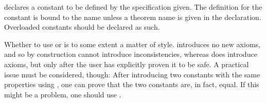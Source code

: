 \begin{isabellebody}
\begin{isamarkuptext}
\begin{description}
  \item {} declares a constant to be defined by the
  specification given.  The definition for the constant  is
  bound to the name  unless a theorem name is given in
  the declaration.  Overloaded constants should be declared as such.

  \end{description}

  Whether to use \hyperlink{command.HOL.specification}{\mbox{}} or \hyperlink{command.HOL.ax-specification}{\mbox{}} is to some extent a matter of style.  \hyperlink{command.HOL.specification}{\mbox{}} introduces no new axioms, and so by
  construction cannot introduce inconsistencies, whereas \hyperlink{command.HOL.ax-specification}{\mbox{}} does introduce axioms, but only after the
  user has explicitly proven it to be safe.  A practical issue must be
  considered, though: After introducing two constants with the same
  properties using \hyperlink{command.HOL.specification}{\mbox{}}, one can prove
  that the two constants are, in fact, equal.  If this might be a
  problem, one should use \hyperlink{command.HOL.ax-specification}{\mbox{}}.%
\end{isamarkuptext}%
\isamarkuptrue%
%
\isadelimtheory
%
\endisadelimtheory
%
\isatagtheory
{}\isamarkupfalse%
%
\endisatagtheory
{\isafoldtheory}%
%
\isadelimtheory
%
\endisadelimtheory
\isanewline
\end{isabellebody}%
